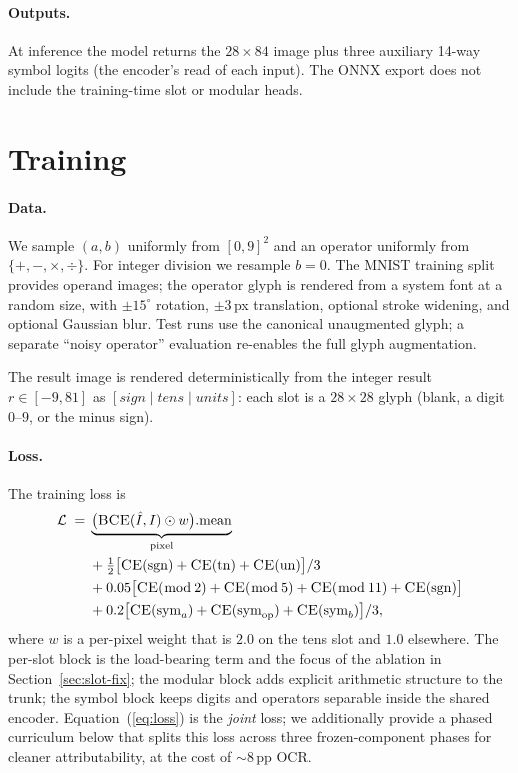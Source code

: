 \documentclass[11pt]{article}
\theoremstyle{papsty}
\newcommand{\set}[1]{\{#1\}}
\begin{document}
\paragraph{Outputs.}
At inference the model returns the $28\!\times\!84$ image plus three
auxiliary 14-way symbol logits (the encoder's read of each input). The
ONNX export does not include the training-time slot or modular heads.

\section{Training}
\label{sec:training}

\paragraph{Data.}
We sample $(a, b)$ uniformly from $[0,9]^{2}$ and an operator uniformly
from $\set{+, -, \times, \div}$. For integer division we resample
$b\!=\!0$. The MNIST training split provides operand images; the
operator glyph is rendered from a system font at a random size, with
$\pm 15^{\circ}$ rotation, $\pm 3$\,px translation, optional stroke
widening, and optional Gaussian blur. Test runs use the canonical
unaugmented glyph; a separate ``noisy operator'' evaluation re-enables
the full glyph augmentation.

The result image is rendered deterministically from the integer result
$r \in [-9, 81]$ as $[\textit{sign} \mid \textit{tens} \mid
\textit{units}]$: each slot is a $28\!\times\!28$ glyph (blank, a digit
$0\text{--}9$, or the minus sign).

\paragraph{Loss.}
The training loss is
\begin{equation}
\begin{split}
\mathcal{L} \;=\; & \underbrace{\big(\textsc{BCE}(\hat{I}, I)\odot w\big).\mathrm{mean}}_{\text{pixel}} \\
  & + \tfrac{1}{2}\big[\textsc{CE}(\mathrm{sgn}) + \textsc{CE}(\mathrm{tn}) + \textsc{CE}(\mathrm{un})\big]/3 \\
  & + 0.05\big[\textsc{CE}(\bmod\,2) + \textsc{CE}(\bmod\,5) + \textsc{CE}(\bmod\,11) + \textsc{CE}(\mathrm{sgn})\big] \\
  & + 0.2\big[\textsc{CE}(\mathrm{sym}_a) + \textsc{CE}(\mathrm{sym}_{\mathrm{op}}) + \textsc{CE}(\mathrm{sym}_b)\big]/3,
\end{split}
\label{eq:loss}
\end{equation}
where $w$ is a per-pixel weight that is $2.0$ on the tens slot and $1.0$
elsewhere. The per-slot block is the load-bearing term and the focus of
the ablation in Section~\ref{sec:slot-fix}; the modular block adds
explicit arithmetic structure to the trunk; the symbol block keeps
digits and operators separable inside the shared encoder.
Equation~(\ref{eq:loss}) is the \emph{joint} loss; we additionally
provide a phased curriculum below that splits this loss across three
frozen-component phases for cleaner attributability, at the cost of
$\sim 8$\,pp OCR.
\end{document}
